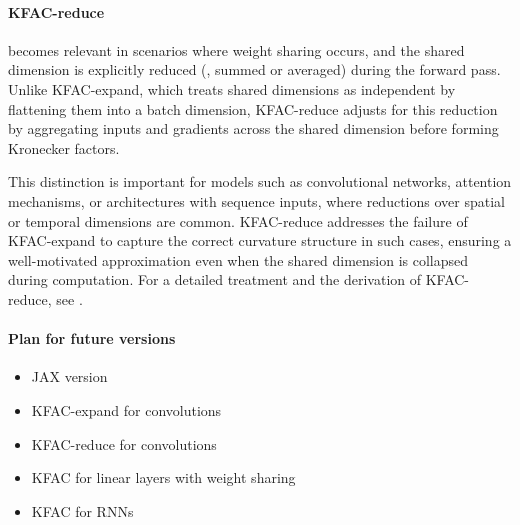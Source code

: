 \paragraph{KFAC-reduce} becomes relevant in scenarios where weight sharing occurs, and the shared dimension is explicitly reduced (\eg, summed or averaged) during the forward pass. Unlike KFAC-expand, which treats shared dimensions as independent by flattening them into a batch dimension, KFAC-reduce adjusts for this reduction by aggregating inputs and gradients across the shared dimension before forming Kronecker factors.

This distinction is important for models such as convolutional networks, attention mechanisms, or architectures with sequence inputs, where reductions over spatial or temporal dimensions are common. KFAC-reduce addresses the failure of KFAC-expand to capture the correct curvature structure in such cases, ensuring a well-motivated approximation even when the shared dimension is collapsed during computation. For a detailed treatment and the derivation of KFAC-reduce, see \citet{eschenhagen2023kroneckerfactored}.

\paragraph{Plan for future versions}
\begin{itemize}
\item JAX version
\item KFAC-expand for convolutions \cite{grosse2016kroneckerfactored}
\item KFAC-reduce for convolutions \cite{eschenhagen2023kroneckerfactored}
\item KFAC for linear layers with weight sharing \cite{eschenhagen2023kroneckerfactored}
\item KFAC for RNNs \cite{martens2018kroneckerfactored}
\end{itemize}